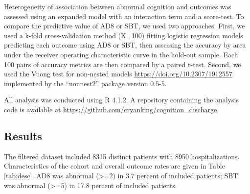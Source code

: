 \documentclass[
]{article}
\begin{document}
Heterogeneity of association between abnormal cognition and outcomes was assessed using an expanded model with an interaction term and a score-test.
To compare the predictive value of AD8 or SBT, we used two approaches.
First, we used a k-fold cross-validation method (K=100) fitting logistic regression models predicting each outcome using AD8 or SBT, then assessing the accuracy by area under the receiver operating characteristic curve in the hold-out sample. Each 100 pairs of accuracy metrics are then compared by a paired t-test.
Second, we used the Vuong test for non-nested models \url{https://doi.org/10.2307/1912557} implemented by the ``nonnest2'' package version 0.5-5.

All analysis was conducted using R 4.1.2. A repository containing the analysis code is available at \url{https://github.com/cryanking/cognition_discharge}

\hypertarget{results}{%
\subsection{Results}\label{results}}

The filtered dataset included 8315 distinct patients with 8950 hospitalizations.
Characteristics of the cohort and overall outcome rates are given in Table \ref{tab:desc}.
AD8 was abnormal (\textgreater=2) in 3.7 percent of included patients; SBT was abnormal (\textgreater=5) in 17.8 percent of included patients.
\end{document}
